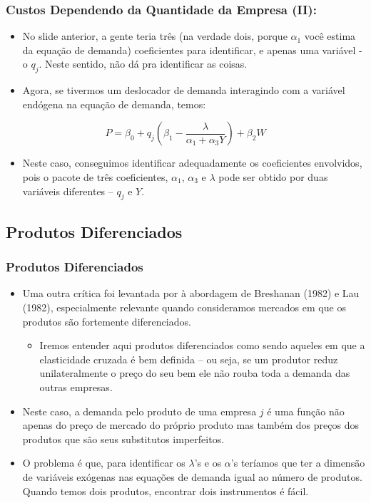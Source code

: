 \documentclass{beamer}
\begin{document}
\begin{frame}\frametitle{Custos Dependendo da Quantidade da Empresa (II):}

\begin{itemize}
\item No slide anterior, a gente teria três (na verdade dois, porque $\alpha_{1}$
você estima da equação de demanda) coeficientes para identificar,
e apenas uma variável - o $q_{j}$. Neste sentido, não dá pra identificar
as coisas.
\item Agora, se tivermos um deslocador de demanda interagindo com a variável
endógena na equação de demanda, temos:
\end{itemize}
\[
P=\beta_{0}+q_{j}\left(\beta_{1}-\frac{\lambda}{\alpha_{1}+\alpha_{3}Y}\right)+\beta_{2}W
\]

\begin{itemize}
\item Neste caso, conseguimos identificar adequadamente os coeficientes
envolvidos, pois o pacote de três coeficientes, $\alpha_{1}$, $\alpha_{3}$
e $\lambda$ pode ser obtido por duas variáveis diferentes --
$q_{j}$ e $Y$. 
\end{itemize}
\end{frame}


\subsection{Produtos Diferenciados}
\begin{frame}\frametitle{Produtos Diferenciados}

\begin{itemize}
\small
\item Uma outra crítica foi levantada por \citet{Nevo1998a} à abordagem de Breshanan
(1982) e Lau (1982), especialmente relevante quando consideramos mercados
em que os produtos são fortemente diferenciados. 

\begin{itemize}
\item Iremos entender aqui produtos diferenciados como sendo aqueles em
que a elasticidade cruzada é bem definida -- ou seja, se
um produtor reduz unilateralmente o preço do seu bem ele não rouba
toda a demanda das outras empresas.
\end{itemize}
\item Neste caso, a demanda pelo produto de uma empresa $j$ é uma função
não apenas do preço de mercado do próprio produto mas também dos preços
dos produtos que são seus substitutos imperfeitos.
\item O problema é que, para identificar os $\lambda$'s e os $\alpha$'s
teríamos que ter a dimensão de variáveis exógenas nas equações de
demanda igual ao número de produtos. Quando temos dois produtos, encontrar
dois instrumentos é fácil. 
\end{itemize}
\end{frame}
\end{document}
